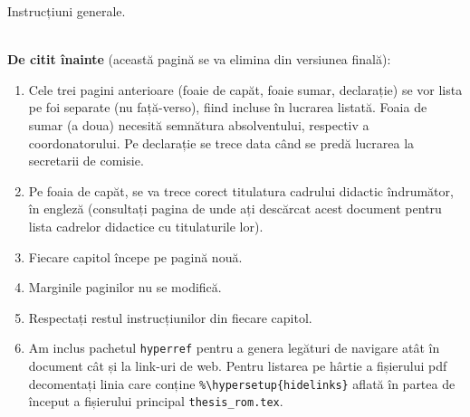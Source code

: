 \thispagestyle{empty}
\begin{center}\large
	Instrucțiuni generale.
\end{center}
~\\

{\color{red}\large{\bf De citit înainte} (această pagină se va elimina din versiunea finală)}:\\
\begin{enumerate}
 \item Cele trei pagini anterioare (foaie de capăt, foaie sumar, declarație) se vor lista pe foi separate (nu față-verso), fiind incluse în lucrarea listată.
 Foaia de sumar (a doua) necesită semnătura absolventului, respectiv a coordonatorului.
 Pe declarație se trece data când se predă lucrarea la secretarii de comisie.
 \item Pe foaia de capăt, se va trece corect titulatura cadrului didactic îndrumător, în engleză (consultați pagina de unde ați descărcat acest document pentru lista cadrelor didactice cu titulaturile lor).
 \item Fiecare capitol începe pe pagină nouă.
 \item Marginile paginilor nu se modifică.
 \item Respectați restul instrucțiunilor din fiecare capitol.
 \item Am inclus pachetul \verb+hyperref+ pentru a genera legături de navigare atât în document cât și la link-uri de web. Pentru listarea pe hârtie a fișierului pdf decomentați linia care conține \verb+%\hypersetup{hidelinks}+
 aflată în partea de început a fișierului principal \verb+thesis_rom.tex+.
\end{enumerate}
